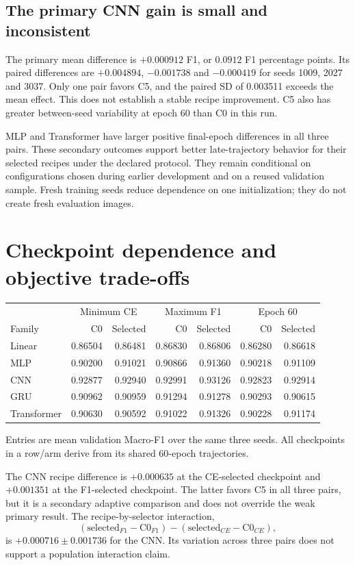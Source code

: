 \subsection{The primary CNN gain is small and inconsistent}
The primary mean difference is $+0.000912$ F1, or $0.0912$ F1 percentage points. Its paired differences are $+0.004894$, $-0.001738$ and $-0.000419$ for seeds 1009, 2027 and 3037. Only one pair favors C5, and the paired SD of 0.003511 exceeds the mean effect. This does not establish a stable recipe improvement. C5 also has greater between-seed variability at epoch 60 than C0 in this run.

MLP and Transformer have larger positive final-epoch differences in all three pairs. These secondary outcomes support better late-trajectory behavior for their selected recipes under the declared protocol. They remain conditional on configurations chosen during earlier development and on a reused validation sample. Fresh training seeds reduce dependence on one initialization; they do not create fresh evaluation images.

\clearpage
\section{Checkpoint dependence and objective trade-offs}
\begin{center}\small
\setlength{\tabcolsep}{5pt}
\begin{tabular}{lrrrrrr}\toprule
& \multicolumn{2}{c}{Minimum CE} & \multicolumn{2}{c}{Maximum F1} & \multicolumn{2}{c}{Epoch 60}\\
Family & C0 & Selected & C0 & Selected & C0 & Selected\\\midrule
Linear & 0.86504 & 0.86481 & 0.86830 & 0.86806 & 0.86280 & 0.86618\\
MLP & 0.90200 & 0.91021 & 0.90866 & 0.91360 & 0.90218 & 0.91109\\
CNN & 0.92877 & 0.92940 & 0.92991 & 0.93126 & 0.92823 & 0.92914\\
GRU & 0.90962 & 0.90959 & 0.91294 & 0.91278 & 0.90293 & 0.90615\\
Transformer & 0.90630 & 0.90592 & 0.91022 & 0.91326 & 0.90228 & 0.91174\\\bottomrule
\end{tabular}\end{center}
Entries are mean validation Macro-F1 over the same three seeds. All checkpoints in a row/arm derive from its shared 60-epoch trajectories.

The CNN recipe difference is $+0.000635$ at the CE-selected checkpoint and $+0.001351$ at the F1-selected checkpoint. The latter favors C5 in all three pairs, but it is a secondary adaptive comparison and does not override the weak primary result. The recipe-by-selector interaction,
\[
  (\mathrm{selected}_{F1}-\mathrm{C0}_{F1})
  -(\mathrm{selected}_{CE}-\mathrm{C0}_{CE}),
\]
is $+0.000716\pm0.001736$ for the CNN. Its variation across three pairs does not support a population interaction claim.

